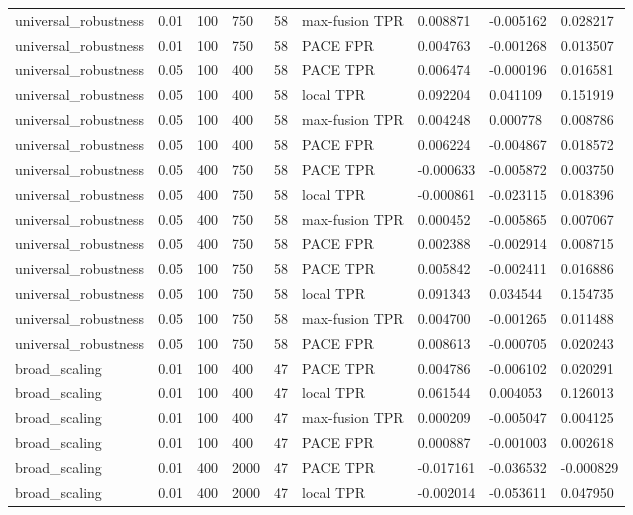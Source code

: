 \begin{tabular}{lllllllll}
universal\_robustness & 0.01 & 100 & 750 & 58 & max-fusion TPR & 0.008871 & -0.005162 & 0.028217 \\
universal\_robustness & 0.01 & 100 & 750 & 58 & PACE FPR & 0.004763 & -0.001268 & 0.013507 \\
universal\_robustness & 0.05 & 100 & 400 & 58 & PACE TPR & 0.006474 & -0.000196 & 0.016581 \\
universal\_robustness & 0.05 & 100 & 400 & 58 & local TPR & 0.092204 & 0.041109 & 0.151919 \\
universal\_robustness & 0.05 & 100 & 400 & 58 & max-fusion TPR & 0.004248 & 0.000778 & 0.008786 \\
universal\_robustness & 0.05 & 100 & 400 & 58 & PACE FPR & 0.006224 & -0.004867 & 0.018572 \\
universal\_robustness & 0.05 & 400 & 750 & 58 & PACE TPR & -0.000633 & -0.005872 & 0.003750 \\
universal\_robustness & 0.05 & 400 & 750 & 58 & local TPR & -0.000861 & -0.023115 & 0.018396 \\
universal\_robustness & 0.05 & 400 & 750 & 58 & max-fusion TPR & 0.000452 & -0.005865 & 0.007067 \\
universal\_robustness & 0.05 & 400 & 750 & 58 & PACE FPR & 0.002388 & -0.002914 & 0.008715 \\
universal\_robustness & 0.05 & 100 & 750 & 58 & PACE TPR & 0.005842 & -0.002411 & 0.016886 \\
universal\_robustness & 0.05 & 100 & 750 & 58 & local TPR & 0.091343 & 0.034544 & 0.154735 \\
universal\_robustness & 0.05 & 100 & 750 & 58 & max-fusion TPR & 0.004700 & -0.001265 & 0.011488 \\
universal\_robustness & 0.05 & 100 & 750 & 58 & PACE FPR & 0.008613 & -0.000705 & 0.020243 \\
broad\_scaling & 0.01 & 100 & 400 & 47 & PACE TPR & 0.004786 & -0.006102 & 0.020291 \\
broad\_scaling & 0.01 & 100 & 400 & 47 & local TPR & 0.061544 & 0.004053 & 0.126013 \\
broad\_scaling & 0.01 & 100 & 400 & 47 & max-fusion TPR & 0.000209 & -0.005047 & 0.004125 \\
broad\_scaling & 0.01 & 100 & 400 & 47 & PACE FPR & 0.000887 & -0.001003 & 0.002618 \\
broad\_scaling & 0.01 & 400 & 2000 & 47 & PACE TPR & -0.017161 & -0.036532 & -0.000829 \\
broad\_scaling & 0.01 & 400 & 2000 & 47 & local TPR & -0.002014 & -0.053611 & 0.047950 \\

\end{tabular}
